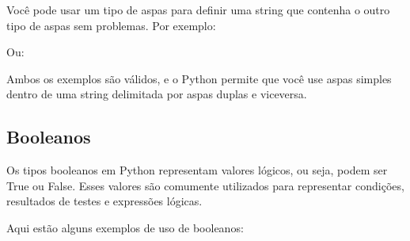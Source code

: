 \documentclass[letterpaper,10pt,english]{jupyterBook}
\begin{document}
\sphinxAtStartPar
Você pode usar um tipo de aspas para definir uma string que contenha o outro tipo de aspas sem problemas. Por exemplo:

\begin{sphinxVerbatim}[commandchars=\\\{\}]
  
\end{sphinxVerbatim}

\sphinxAtStartPar
Ou:

\begin{sphinxVerbatim}[commandchars=\\\{\}]
  
\end{sphinxVerbatim}

\sphinxAtStartPar
Ambos os exemplos são válidos, e o Python permite que você use aspas simples dentro de uma string delimitada por aspas duplas e vice\sphinxhyphen{}versa.


\subsection{Booleanos}
\label{\detokenize{chapters/ch2/ch2:booleanos}}
\sphinxAtStartPar
Os tipos booleanos em Python representam valores lógicos, ou seja, podem ser True ou False. Esses valores são comumente utilizados para representar condições, resultados de testes e expressões lógicas.

\sphinxAtStartPar
Aqui estão alguns exemplos de uso de booleanos:
\end{document}
